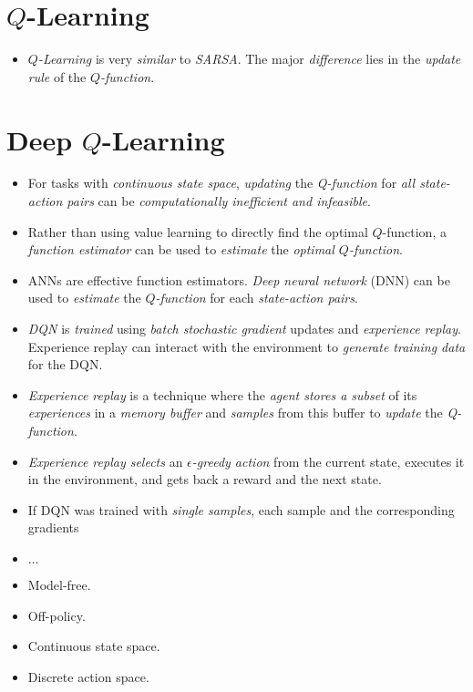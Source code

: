 \documentclass[
	number={11},
	title={Reinforcement Learning}
]{cs584notes}
\begin{document}
\section{$Q$-Learning}\label{sec:q-learning}
\begin{itemize}
	\item \emph{$Q$-Learning} is very \emph{similar} to \emph{SARSA}.
	The major \emph{difference} lies in the \emph{update rule} of the \emph{$Q$-function}.
\end{itemize}

\section{Deep $Q$-Learning}\label{sec:deep-q-learning}
\begin{itemize}
	\item For tasks with \emph{continuous state space}, \emph{updating} the \emph{Q-function} for \emph{all state-action pairs} can be \emph{computationally inefficient and infeasible}.
	\item Rather than using value learning to directly find the optimal $Q$-function, a \emph{function estimator} can be used to \emph{estimate} the \emph{optimal $Q$-function}.
	\item ANNs are effective function estimators.
	\emph{Deep neural network} (DNN) can be used to \emph{estimate} the \emph{$Q$-function} for each \emph{state-action pairs}.
	\item \emph{DQN} is \emph{trained} using \emph{batch stochastic gradient} updates and \emph{experience replay}.
	Experience replay can interact with the environment to \emph{generate training data} for the DQN.
	\item \emph{Experience replay} is a technique where the \emph{agent stores a subset} of its \emph{experiences}  in a \emph{memory buffer} and \emph{samples} from this buffer to \emph{update} the \emph{Q-function}.
	\item \emph{Experience replay selects} an \emph{$\epsilon$-greedy action} from the current state, executes it in the environment, and gets back a reward and the next state.
	\item If DQN was trained with \emph{single samples}, each sample and the corresponding gradients
	\item $\dots$
	\item Model-free.
	\item Off-policy.
	\item Continuous state space.
	\item Discrete action space.
\end{itemize}
\end{document}
